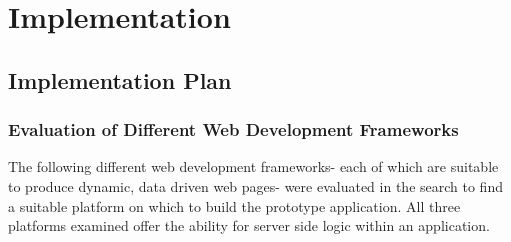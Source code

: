 \documentclass[a4paper,12pt]{article}
\begin{document}
\section {Implementation}
\subsection {Implementation Plan}

\subsubsection{Evaluation of Different Web Development Frameworks}
The following different web development frameworks- each of which are suitable to produce dynamic, data driven web pages- were evaluated in the search to find a suitable platform on which to build the prototype application. All three platforms examined offer the ability for server side logic within an application.
\end{document}
